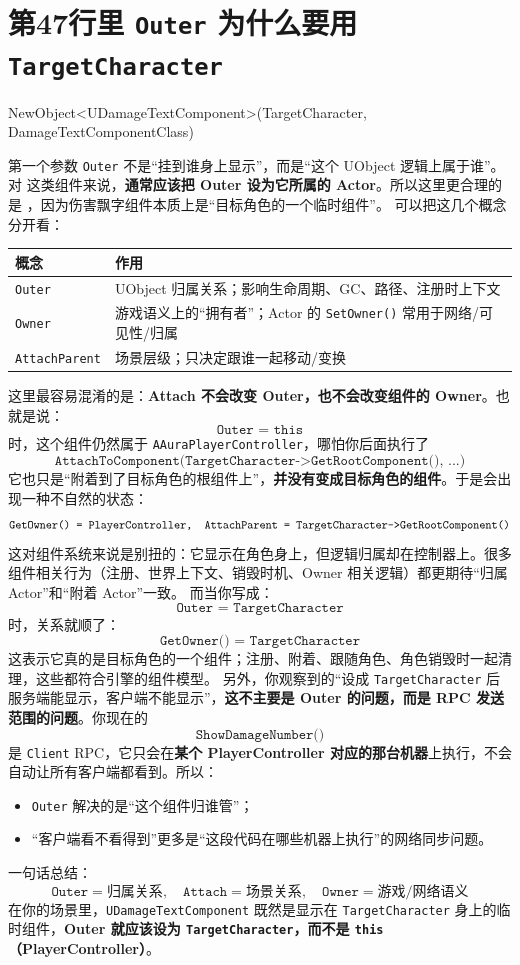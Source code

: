 \documentclass[10pt,CJKmath]{ctexart}
\begin{document}
\section{第47行里 \texttt{Outer} 为什么要用 \texttt{TargetCharacter}}
\begin{code}
NewObject<UDamageTextComponent>(TargetCharacter, DamageTextComponentClass)
\end{code}
第一个参数 \texttt{Outer} 不是“挂到谁身上显示”，而是“这个 UObject 逻辑上属于谁”。对  这类组件来说，\textbf{通常应该把 Outer 设为它所属的 Actor}。所以这里更合理的是 ，因为伤害飘字组件本质上是“目标角色的一个临时组件”。
可以把这几个概念分开看：
\begin{center}
\begin{longtable}{|l|l|} 
	\hline \textbf{概念} & \textbf{作用} \\ \hline \texttt{Outer} & UObject 归属关系；影响生命周期、GC、路径、注册时上下文 \\
	\hline \texttt{Owner} & 游戏语义上的“拥有者”；Actor 的 \texttt{SetOwner()} 常用于网络/可见性/归属 \\ \hline
	\texttt{AttachParent} & 场景层级；只决定跟谁一起移动/变换 \\ \hline 
\end{longtable}
\end{center}
这里最容易混淆的是：\textbf{Attach 不会改变 Outer，也不会改变组件的 Owner}。也就是说：
\[ \texttt{Outer = this} \]
时，这个组件仍然属于 \texttt{AAuraPlayerController}，哪怕你后面执行了
\[ \texttt{AttachToComponent(TargetCharacter->GetRootComponent(), ...)} \]
它也只是“附着到了目标角色的根组件上”，\textbf{并没有变成目标角色的组件}。于是会出现一种不自然的状态：
\[ \texttt{GetOwner() = PlayerController,\quad AttachParent = TargetCharacter->GetRootComponent()} \]
这对组件系统来说是别扭的：它显示在角色身上，但逻辑归属却在控制器上。很多组件相关行为（注册、世界上下文、销毁时机、Owner 相关逻辑）都更期待“归属 Actor”和“附着 Actor”一致。
而当你写成：
\[ \texttt{Outer = TargetCharacter} \]
时，关系就顺了：
\[ \texttt{GetOwner() = TargetCharacter} \]
这表示它真的是目标角色的一个组件；注册、附着、跟随角色、角色销毁时一起清理，这些都符合引擎的组件模型。
另外，你观察到的“设成 \texttt{TargetCharacter} 后服务端能显示，客户端不能显示”，\textbf{这不主要是 Outer 的问题，而是 RPC 发送范围的问题}。你现在的
\[ \texttt{ShowDamageNumber()} \]
是 \texttt{Client} RPC，它只会在\textbf{某个 PlayerController 对应的那台机器}上执行，不会自动让所有客户端都看到。所以：
\begin{itemize} 
	\item \texttt{Outer} 解决的是“这个组件归谁管”； 
	\item “客户端看不看得到”更多是“这段代码在哪些机器上执行”的网络同步问题。 
\end{itemize}
一句话总结：
\[ \boxed{\texttt{Outer} = \text{归属关系},\quad \texttt{Attach} = \text{场景关系},\quad \texttt{Owner} = \text{游戏/网络语义}} \]
在你的场景里，\texttt{UDamageTextComponent} 既然是显示在 \texttt{TargetCharacter} 身上的临时组件，\textbf{Outer 就应该设为 \texttt{TargetCharacter}，而不是 \texttt{this}（PlayerController）}。
\end{document}
